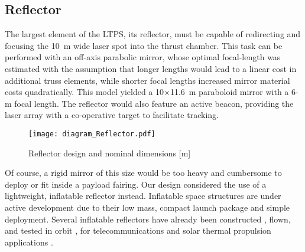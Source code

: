 \documentclass[final,3p,times,twocolumn,sort&compress, lefttitle]{elsarticle}
\begin{document}
        \subsection{Reflector}
            The largest element of the LTPS, its reflector, must be capable of redirecting and focusing the 10~m wide laser spot into the thrust chamber. This task can be performed with an off-axis parabolic mirror, whose optimal focal-length was estimated with the assumption that longer lengths would lead to a linear cost in additional truss elements, while shorter focal lengths increased mirror material costs quadratically. This model yielded a 10$\times$11.6~m paraboloid mirror with a 6-m focal length. The reflector would also feature an active beacon, providing the laser array with a co-operative target to facilitate tracking.
            
            \begin{figure}[t]
                \centering
                \texttt{[image: diagram\_Reflector.pdf]}
                \caption{Reflector design and nominal dimensions [m]}
                \label{fig:reflector}
            \end{figure}
    
            Of course, a rigid mirror of this size would be too heavy and cumbersome to deploy or fit inside a payload fairing. Our design considered the use of a lightweight, inflatable reflector instead. Inflatable space structures are under active development due to their low mass, compact launch package and simple deployment. Several inflatable reflectors have already been constructed \cite{engberg_modal_2000}, flown, and tested in orbit \cite{freeland_large_1997}, for telecommunications and solar thermal propulsion applications \cite{jacob_inflatable_2020}.
            
\end{document}
